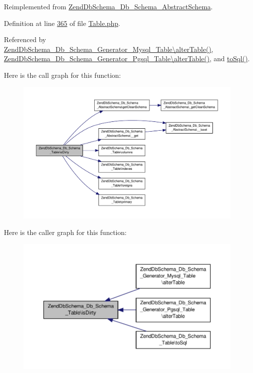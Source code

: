 Reimplemented from \hyperlink{classZendDbSchema__Db__Schema__AbstractSchema_ae859790a91bbcb9c4dc52a6139e5999e}{Zend\-Db\-Schema\-\_\-\-Db\-\_\-\-Schema\-\_\-\-Abstract\-Schema}.



Definition at line \hyperlink{Table_8php_source_l00365}{365} of file \hyperlink{Table_8php_source}{Table.\-php}.



Referenced by \hyperlink{Generator_2Mysql_2Table_8php_source_l00074}{Zend\-Db\-Schema\-\_\-\-Db\-\_\-\-Schema\-\_\-\-Generator\-\_\-\-Mysql\-\_\-\-Table\textbackslash{}alter\-Table()}, \hyperlink{Generator_2Pgsql_2Table_8php_source_l00083}{Zend\-Db\-Schema\-\_\-\-Db\-\_\-\-Schema\-\_\-\-Generator\-\_\-\-Pgsql\-\_\-\-Table\textbackslash{}alter\-Table()}, and \hyperlink{Table_8php_source_l00327}{to\-Sql()}.



Here is the call graph for this function\-:\nopagebreak
\begin{figure}[H]
\begin{center}
\leavevmode
\includegraphics[width=350pt]{classZendDbSchema__Db__Schema__Table_a21a2a75870207a989576655fec7507c3_cgraph}
\end{center}
\end{figure}




Here is the caller graph for this function\-:\nopagebreak
\begin{figure}[H]
\begin{center}
\leavevmode
\includegraphics[width=350pt]{classZendDbSchema__Db__Schema__Table_a21a2a75870207a989576655fec7507c3_icgraph}
\end{center}
\end{figure}


